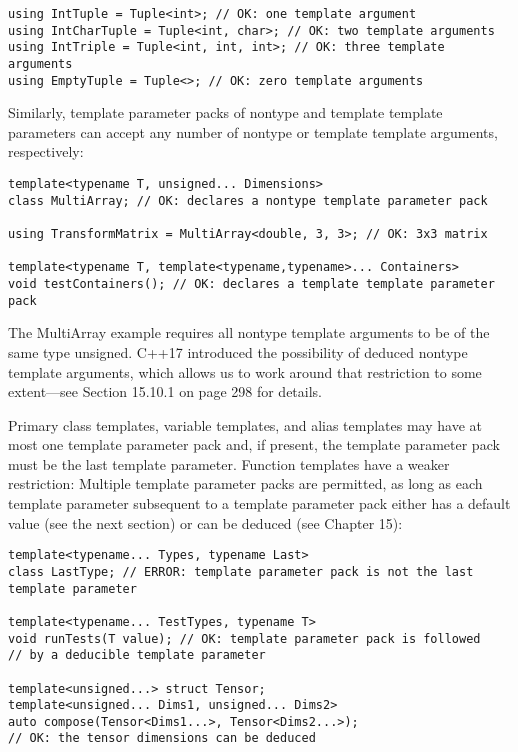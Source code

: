 \begin{lstlisting}[style=styleCXX]
using IntTuple = Tuple<int>; // OK: one template argument
using IntCharTuple = Tuple<int, char>; // OK: two template arguments
using IntTriple = Tuple<int, int, int>; // OK: three template arguments
using EmptyTuple = Tuple<>; // OK: zero template arguments
\end{lstlisting}

Similarly, template parameter packs of nontype and template template parameters can accept any number of nontype or template template arguments, respectively:

\begin{lstlisting}[style=styleCXX]
template<typename T, unsigned... Dimensions>
class MultiArray; // OK: declares a nontype template parameter pack

using TransformMatrix = MultiArray<double, 3, 3>; // OK: 3x3 matrix

template<typename T, template<typename,typename>... Containers>
void testContainers(); // OK: declares a template template parameter pack
\end{lstlisting}

The MultiArray example requires all nontype template arguments to be of the same type unsigned. C++17 introduced the possibility of deduced nontype template arguments, which allows us to work around that restriction to some extent—see Section 15.10.1 on page 298 for details. 

Primary class templates, variable templates, and alias templates may have at most one template parameter pack and, if present, the template parameter pack must be the last template parameter. Function templates have a weaker restriction: Multiple template parameter packs are permitted, as long as each template parameter subsequent to a template parameter pack either has a default value (see the next section) or can be deduced (see Chapter 15):

\begin{lstlisting}[style=styleCXX]
template<typename... Types, typename Last>
class LastType; // ERROR: template parameter pack is not the last template parameter

template<typename... TestTypes, typename T>
void runTests(T value); // OK: template parameter pack is followed
// by a deducible template parameter

template<unsigned...> struct Tensor;
template<unsigned... Dims1, unsigned... Dims2>
auto compose(Tensor<Dims1...>, Tensor<Dims2...>);
// OK: the tensor dimensions can be deduced
\end{lstlisting}

